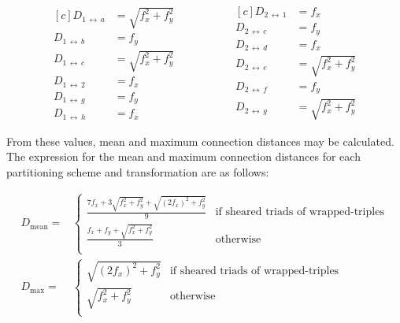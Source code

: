 			\begin{equation*}
				\begin{aligned}[c]
					D_{1\,\leftrightarrow{}\,a} &= \sqrt{f_x^2 + f_y^2} \\
					D_{1\,\leftrightarrow{}\,b} &= f_y \\
					D_{1\,\leftrightarrow{}\,c} &= \sqrt{f_x^2 + f_y^2} \\
					D_{1\,\leftrightarrow{}\,2} &= f_x \\
					D_{1\,\leftrightarrow{}\,g} &= f_y \\
					D_{1\,\leftrightarrow{}\,h} &= f_x
				\end{aligned}
				\hspace{2cm}
				\begin{aligned}[c]
					D_{2\,\leftrightarrow{}\,1} &= f_x \\
					D_{2\,\leftrightarrow{}\,c} &= f_y \\
					D_{2\,\leftrightarrow{}\,d} &= f_x \\
					D_{2\,\leftrightarrow{}\,e} &= \sqrt{f_x^2 + f_y^2} \\
					D_{2\,\leftrightarrow{}\,f} &= f_y \\
					D_{2\,\leftrightarrow{}\,g} &= \sqrt{f_x^2 + f_y^2}
				\end{aligned}
			\end{equation*}
			
			From these values, mean and maximum connection distances may be
			calculated. The expression for the mean and maximum connection distances
			for each partitioning scheme and transformation are as follows:
			
			\begin{align*}
				D_{\textrm{mean}}=&
					\begin{cases}
						\frac{7f_x + 3\sqrt{f_x^2 + f_y^2} + \sqrt{(2f_x)^2 + f_y^2}}{9} &
							\textrm{if sheared triads of wrapped-triples}\\
						\frac{f_x + f_y + \sqrt{f_x^2 + f_y^2}}{3} &
							\textrm{otherwise}\\
					\end{cases} \\
				D_{\textrm{max}}=&
					\begin{cases}
						\sqrt{(2f_x)^2 + f_y^2} &
							\textrm{if sheared triads of wrapped-triples}\\
						\sqrt{f_x^2 + f_y^2} &
							\textrm{otherwise}\\
					\end{cases}
			\end{align*}
			
